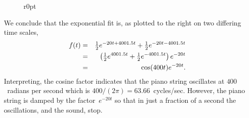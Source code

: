 \begin{example}
\begin{solution}
\begin{figure}r{0pt}  \ \end{figure}
We conclude that the exponential fit is, as plotted to the right on two differing time scales,
\begin{eqnarray*}
f(t)&=&\tfrac12e^{-20t+4001.5 t}+\tfrac12e^{-20t-4001.5 t}
\\&=&\left(\tfrac12e^{4001.5 t}+\tfrac12e^{-4001.5 t}\right)e^{-20t}
\\&=&\cos(400t)e^{-20t}.
\end{eqnarray*}
Interpreting, the cosine factor indicates that the piano string oscillates at \(400\)~radians per second which is \(400/(2\pi)=63.66\)~cycles/sec.
However, the piano string is damped by the factor~\(e^{-20t}\) so that in just a fraction of a second the oscillations, and the sound, stop.
\aqed

\end{solution}
\end{example}
\endgroup




